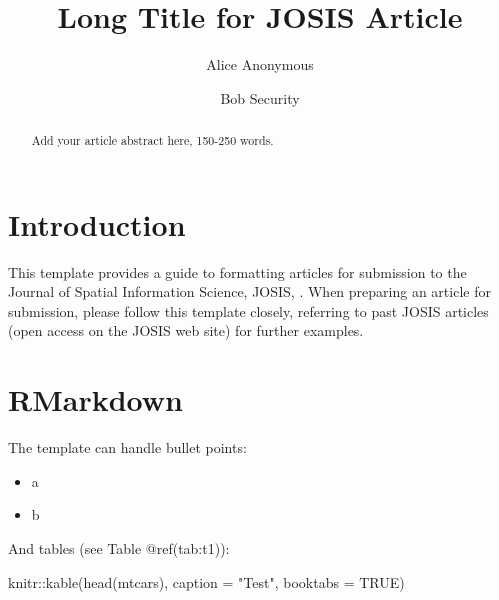 \documentclass{josis}
\newenvironment{Shaded}{\begin{snugshade}}{\end{snugshade}}
\newcommand{\AttributeTok}[1]{\textcolor[rgb]{0.77,0.63,0.00}{#1}}
\newcommand{\ConstantTok}[1]{\textcolor[rgb]{0.00,0.00,0.00}{#1}}
\newcommand{\FunctionTok}[1]{\textcolor[rgb]{0.00,0.00,0.00}{#1}}
\newcommand{\NormalTok}[1]{#1}
\newcommand{\SpecialCharTok}[1]{\textcolor[rgb]{0.00,0.00,0.00}{#1}}
\newcommand{\StringTok}[1]{\textcolor[rgb]{0.31,0.60,0.02}{#1}}
\providecommand{\tightlist}{%
  \setlength{\itemsep}{0pt}\setlength{\parskip}{0pt}}
\begin{document}


\title{Long Title for JOSIS Article}

  \author{Alice Anonymous}
  \author{Bob Security}

\maketitle


\begin{abstract}
Add your article abstract here, 150-250 words.
\end{abstract}

\hypertarget{introduction}{%
\section{Introduction}\label{introduction}}

This template provides a guide to formatting articles for submission to
the Journal of Spatial Information Science, JOSIS,
. When preparing an article for submission,
please follow this template closely, referring to past JOSIS articles
(open access on the JOSIS web site) for further examples.

\hypertarget{rmarkdown}{%
\section{RMarkdown}\label{rmarkdown}}

The template can handle bullet points:

\begin{itemize}
\tightlist
\item
  a
\item
  b
\end{itemize}

And tables (see Table @ref(tab:t1)):

\begin{Shaded}
\begin{Highlighting}[]
\NormalTok{knitr}\SpecialCharTok{::}\FunctionTok{kable}\NormalTok{(}\FunctionTok{head}\NormalTok{(mtcars), }\AttributeTok{caption =} \StringTok{"Test"}\NormalTok{, }\AttributeTok{booktabs =} \ConstantTok{TRUE}\NormalTok{)}
\end{Highlighting}
\end{Shaded}
\end{document}
